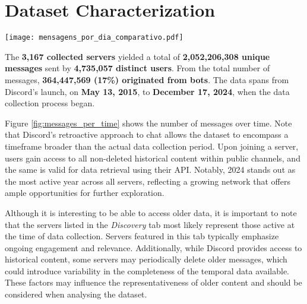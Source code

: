 \section{Dataset Characterization}

\begin{figure*} [t]
    \centering
    \texttt{[image: mensagens\_por\_dia\_comparativo.pdf]}
    \caption{Evolution of the daily number of messages sent over time. The top panel presents the complete time series, distinguishing between messages sent by regular users (in blue) and bots (in red). The bottom-left panel focuses on the initial period, covering up to October 2022, while the bottom-right panel highlights the most recent period, from June 2022 to January 2024. Notice the graph scales are different.}
    \label{fig:messages_per_time}
\end{figure*}


The \textbf{3,167 collected servers} yielded a total of \textbf{2,052,206,308 unique messages} sent by \textbf{4,735,057 distinct users}. From the total number of messages,   \textbf{364,447,569 (17\%) originated from bots}. The data spans from Discord's launch, on \textbf{May 13, 2015}, to \textbf{December 17, 2024}, when the data collection process began.

Figure \ref{fig:messages_per_time} shows the number of messages over time. 
Note that Discord's retroactive approach to chat allows the dataset to encompass a timeframe broader than the actual data collection period.
Upon joining a server, users gain access to all non-deleted historical content within public channels, and the same is valid for data retrieval using their API.
Notably, 2024 stands out as the most active year across all servers, reflecting a growing network that offers ample opportunities for further exploration.

Although it is interesting to be able to access older data, it is important to note that the servers listed in the \textit{Discovery} tab most likely represent those active at the time of data collection. Servers featured in this tab typically emphasize ongoing engagement and relevance. Additionally, while Discord provides access to historical content, some servers may periodically delete older messages, which could introduce variability in the completeness of the temporal data available. These factors may influence the representativeness of older content and should be considered when analysing the dataset.

